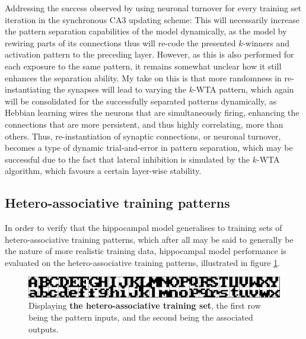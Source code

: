 Addressing the success observed by using neuronal turnover for every training set iteration in the synchronous CA3 updating scheme:
This will necessarily increase the pattern separation capabilities of the model dynamically, as the model by rewiring parts of its connections thus will re-code the presented $k$-winners and activation pattern to the preceding layer. However, as this is also performed for each exposure to the same pattern, it remains somewhat unclear how it still enhances the separation ability. My take on this is that more randomness in re-instantiating the synapses will lead to varying the $k$-WTA pattern, which again will be consolidated for the successfully separated patterns dynamically, as Hebbian learning wires the neurons that are simultaneously firing, enhancing the connections that are more persistent, and thus highly correlating, more than others. Thus, re-instantiation of synaptic connections, or neuronal turnover, becomes a type of dynamic trial-and-error in pattern separation, which may be successful due to the fact that lateral inhibition is simulated by the $k$-WTA algorithm, which favours a certain layer-wise stability.

\subsection{Hetero-associative training patterns}\label{sect:hetero-associative}

In order to verify that the hippocampal model generalises to training sets of hetero-associative training patterns, which after all may be said to generally be the nature of more realistic training data, hippocampal model performance is evaluated on the hetero-associative training patterns, illustrated in figure \ref{fig:hetero-associative-patterns}.

\begin{figure}
    \centering
    \includegraphics[width=13cm]{fig/im_both_hetero}
    \caption{Displaying \textbf{the hetero-associative training set}, the first row being the pattern inputs, and the second being the associated outputs.}
    \label{fig:hetero-associative-patterns}
\end{figure}

